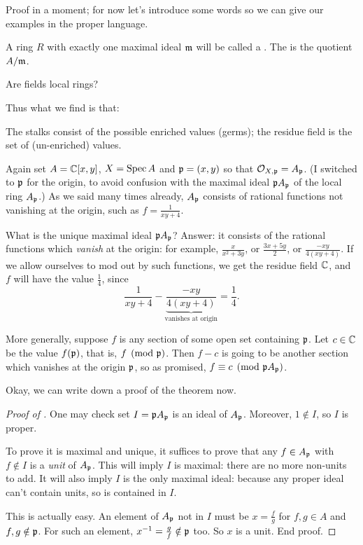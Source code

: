 Proof in a moment;
for now let's introduce some words so we can
give our examples in the proper language.
\begin{definition}
	A ring $R$ with exactly one maximal ideal $\mathfrak m$
	will be called a .
	The  is the quotient $A / \mathfrak m$.
\end{definition}
\begin{ques}
	Are fields local rings?
\end{ques}

Thus what we find is that:
\begin{moral}
	The stalks consist of the possible enriched values (germs);
	the residue field is the set of (un-enriched) values.
\end{moral}

\begin{example}
	Again set $A = \mathbb C[x,y]$, $X = \operatorname{Spec} A$ and $\mathfrak p = (x,y)$
	so that $\mathcal O_{X,\mathfrak p} = A_\mathfrak p$.
	(I switched to $\mathfrak p$ for the origin,
	to avoid confusion with the maximal ideal $\mathfrak p A_{\mathfrak p}$
	of the local ring $A_\mathfrak p$.)
	As we said many times already,
	$A_{\mathfrak p}$ consists of rational functions not vanishing at the origin,
	such as $f = \frac{1}{xy+4}$.

	What is the unique maximal ideal $\mathfrak p A_\mathfrak p$?
	Answer: it consists of the rational functions
	which \emph{vanish} at the origin:
	for example, $\frac{x}{x^2+3y}$, or $\frac{3x+5y}{2}$,
	or $\frac{-xy}{4(xy+4)}$.
	If we allow ourselves to mod out by such functions,
	we get the residue field $\mathbb C$,
	and $f$ will have the value $\frac14$, since
	\[ \frac{1}{xy+4} -
		{\underbrace{\frac{-xy}{4(xy+4)}}_{\text{vanishes at origin}}}
		= \frac14. \]

	More generally, suppose $f$ is any section of some open
	set containing $\mathfrak p$.
	Let $c \in \mathbb C$ be the value $f(\mathfrak p)$, that is, $f \pmod {\mathfrak p}$.
	Then $f - c$ is going to be another section
	which vanishes at the origin $\mathfrak p$,
	so as promised, $f \equiv c \pmod{\mathfrak p A_{\mathfrak p}}$.
\end{example}

Okay, we can write down a proof of the theorem now.
\begin{proof}
	[Proof of ]
	One may check set $I = \mathfrak p A_\mathfrak p$ is an ideal of $A_\mathfrak p$.
	Moreover, $1 \notin I$, so $I$ is proper.

	To prove it is maximal and unique,
	it suffices to prove that any $f \in A_\mathfrak p$ with $f \notin I$
	is a \emph{unit} of $A_\mathfrak p$.
	This will imply $I$ is maximal: there are no more non-units to add.
	It will also imply $I$ is the only maximal ideal:
	because any proper ideal can't contain units, so is contained in $I$.

	This is actually easy.
	An element of $A_\mathfrak p$ not in $I$ must be $x = \frac fg$
	for $f,g \in A$ and $f,g \notin \mathfrak p$.
	For such an element, $x^{-1} = \frac gf \notin \mathfrak p$ too.
	So $x$ is a unit. End proof.
\end{proof}

